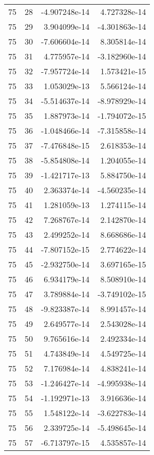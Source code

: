 \begin{tabular}{rrrr}
  75 &   28 & -4.907248e-14 &  4.727328e-14 \\
  75 &   29 &  3.904099e-14 & -4.301863e-14 \\
  75 &   30 & -7.606604e-14 &  8.305814e-14 \\
  75 &   31 &  4.775957e-14 & -3.182960e-14 \\
  75 &   32 & -7.957724e-14 &  1.573421e-15 \\
  75 &   33 &  1.053029e-13 &  5.566124e-14 \\
  75 &   34 & -5.514637e-14 & -8.978929e-14 \\
  75 &   35 &  1.887973e-14 & -1.794072e-15 \\
  75 &   36 & -1.048466e-14 & -7.315858e-14 \\
  75 &   37 & -7.476848e-15 &  2.618353e-14 \\
  75 &   38 & -5.854808e-14 &  1.204055e-14 \\
  75 &   39 & -1.421717e-13 &  5.884750e-14 \\
  75 &   40 &  2.363374e-14 & -4.560235e-14 \\
  75 &   41 &  1.281059e-13 &  1.274115e-14 \\
  75 &   42 &  7.268767e-14 &  2.142870e-14 \\
  75 &   43 &  2.499252e-14 &  8.668686e-14 \\
  75 &   44 & -7.807152e-15 &  2.774622e-14 \\
  75 &   45 & -2.932750e-14 &  3.697165e-15 \\
  75 &   46 &  6.934179e-14 &  8.508910e-14 \\
  75 &   47 &  3.789884e-14 & -3.749102e-15 \\
  75 &   48 & -9.823387e-14 &  8.991457e-14 \\
  75 &   49 &  2.649577e-14 &  2.543028e-14 \\
  75 &   50 &  9.765616e-14 &  2.492334e-14 \\
  75 &   51 &  4.743849e-14 &  4.549725e-14 \\
  75 &   52 &  7.176984e-14 &  4.838241e-14 \\
  75 &   53 & -1.246427e-14 & -4.995938e-14 \\
  75 &   54 & -1.192971e-13 &  3.916636e-14 \\
  75 &   55 &  1.548122e-14 & -3.622783e-14 \\
  75 &   56 &  2.339725e-14 & -5.498645e-14 \\
  75 &   57 & -6.713797e-15 &  4.535857e-14 \\

\end{tabular}
